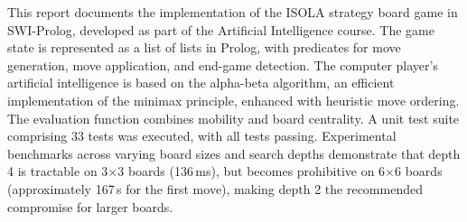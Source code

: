 \abstractEN %

This report documents the implementation of the ISOLA strategy board game
in SWI-Prolog, developed as part of the Artificial Intelligence course.
The game state is represented as a list of lists in Prolog, with predicates
for move generation, move application, and end-game detection.
The computer player's artificial intelligence is based on the alpha-beta
algorithm, an efficient implementation of the minimax principle,
enhanced with heuristic move ordering.
The evaluation function combines mobility and board centrality.
A unit test suite comprising 33 tests was executed, with all tests passing.
Experimental benchmarks across varying board sizes and search depths
demonstrate that depth 4 is tractable on 3$\times$3 boards (136\,ms),
but becomes prohibitive on 6$\times$6 boards (approximately
167\,s for the first move), making depth 2 the recommended
compromise for larger boards.
